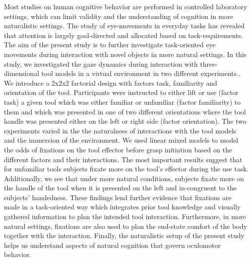 Most studies on human cognitive behavior are performed in controlled laboratory settings, which can limit validity and the understanding of cognition in more naturalistic settings. The study of eye-movements in everyday tasks has revealed that attention is largely goal-directed and allocated based on task-requirements. The aim of the present study is to further investigate task-oriented eye movements during interaction with novel objects in more natural settings. 
In this study, we investigated the gaze dynamics during interaction with three-dimensional tool models in a virtual environment in two different experiments.. We introduce a 2x2x2 factorial design with factors task, familiarity and orientation of the tool. Participants were instructed to either lift or use (factor task) a given tool which was either familiar or unfamiliar (factor familiarity) to them and which was presented in one of two different orientations where the tool handle was presented either on the left or right side (factor orientation). The two experiments varied in the the naturalness of interactions with the tool models and the immersion of the environment.
We used linear mixed models to model the odds of fixations on the tool effector before grasp initiation based on the different factors and their interactions. The most important results suggest that for unfamiliar tools subjects fixate more on the tool's effector during the use task. Additionally, we see that under more natural conditions, subjects fixate more on the handle of the tool when it is presented on the left and in-congruent to the subjects' handedness. 
These findings lend further evidence that fixations are made in a task-oriented way which integrates prior tool knowledge and visually gathered information to plan the intended tool interaction. Furthermore, in more natural settings, fixations are also used to plan the end-state comfort of the body together with the interaction. Finally, the naturalistic setup of the present study helps us understand aspects of natural cognition that govern oculomotor behavior. 
